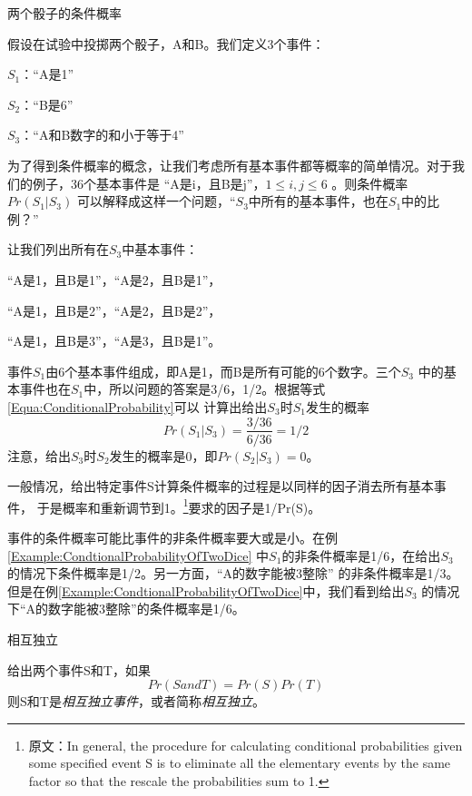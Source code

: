 \begin{example}\label{Example:CondtionalProbabilityOfTwoDice}
两个骰子的条件概率

假设在试验中投掷两个骰子，A和B。我们定义3个事件：

$S_1$：“A是1”

$S_2$：“B是6”

$S_3$：“A和B数字的和小于等于4”

\noindent
为了得到条件概率的概念，让我们考虑所有基本事件都等概率的简单情况。对于我们的例子，36个基本事件是
“A是i，且B是j”，$1\leq i , j \leq 6$ 。则条件概率$Pr(S_1 | S_3)$
可以解释成这样一个问题，“$S_3$中所有的基本事件，也在$S_1$中的比例？”

让我们列出所有在$S_3$中基本事件：

“A是1，且B是1”，“A是2，且B是1”，

“A是1，且B是2”，“A是2，且B是2”，

“A是1，且B是3”，“A是3，且B是1”。

事件$S_1$由6个基本事件组成，即A是1，而B是所有可能的6个数字。三个$S_3$
中的基本事件也在$S_1$中，所以问题的答案是3/6，1/2。根据等式\ref{Equa:ConditionalProbability}可以
计算出给出$S_3$时$S_1$发生的概率
\begin{displaymath}
    Pr(S_1|S_3)=\frac{3/36}{6/36}=1/2
\end{displaymath}
注意，给出$S_3$时$S_2$发生的概率是0，即$Pr(S_2|S_3)=0$。
\end{example}

一般情况，给出特定事件S计算条件概率的过程是以同样的因子消去所有基本事件，
于是概率和重新调节到1。\footnote{原文：In general, the procedure for
calculating conditional probabilities given some specified event S
is to eliminate all the elementary events by the same factor so that
the rescale the probabilities sum to 1.}要求的因子是1/Pr(S)。

事件的条件概率可能比事件的非条件概率要大或是小。在例\ref{Example:CondtionalProbabilityOfTwoDice}
中$S_1$的非条件概率是1/6，在给出$S_3$的情况下条件概率是1/2。另一方面，“A的数字能被3整除”
的非条件概率是1/3。但是在例\ref{Example:CondtionalProbabilityOfTwoDice}中，我们看到给出$S_3$
的情况下“A的数字能被3整除”的条件概率是1/6。

\begin{definition}
相互独立

给出两个事件S和T，如果
    \begin{displaymath}
        Pr(S and T) = Pr(S)Pr(T)
    \end{displaymath}
则S和T是\emph{相互独立事件}，或者简称\emph{相互独立}。
\end{definition}

